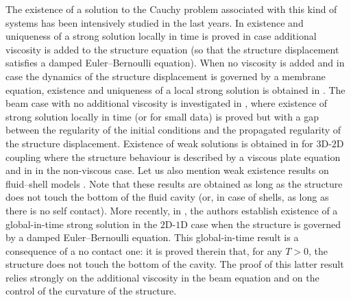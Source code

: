 \documentclass[JEP,XML,SOM,Unicode,NoFloatCountersInSection]{cedram}
\theoremstyle{remark}
\theoremstyle{definition}
\begin{document}
The existence of a solution to the Cauchy problem associated with this kind of systems has been intensively studied in the last years. In \cite{DaVeiga, Lequeurre11, Lequeurre13} existence and uniqueness of a strong solution locally in time is proved in case additional viscosity is added to the structure equation (so that the structure displacement satisfies a damped Euler--Bernoulli equation). When no viscosity is added and in case the dynamics of the structure displacement is governed by a membrane equation, existence and uniqueness of a local strong solution is obtained in \cite{Grandmont-Hillairet-Lequeurre}. The beam case with no additional viscosity is investigated in \cite{Badra-Takahashi}, where existence of strong solution locally in time (or for small data) is proved but with a gap between the regularity of the initial conditions and the propagated regularity of the structure displacement. Existence of weak solutions is obtained in \cite{Chambolle-etal} for $3$D-$2$D coupling where the structure behaviour is described by a viscous plate equation and in \cite{Grandmont08, Muha-Canic13} in the non-viscous case. Let us also mention weak existence results on fluid--shell models \cite{Lengeler, Muha-Schwarzacher}. Note that these results are obtained as long as the structure does not touch the bottom of the fluid cavity (or, in case of shells, as long as there is no self contact). More recently, in \cite{Grandmont-Hillairet}, the authors establish existence of a global-in-time strong solution in the $2$D-$1$D case when the structure is governed by a damped Euler--Bernoulli equation. This global-in-time result is a consequence of a no contact one: it is proved therein that, for any $T>0$, the structure does not touch the bottom of the cavity. The proof of this latter result relies strongly on the additional viscosity in the beam equation and on the control of the curvature of the structure.
\end{document}
